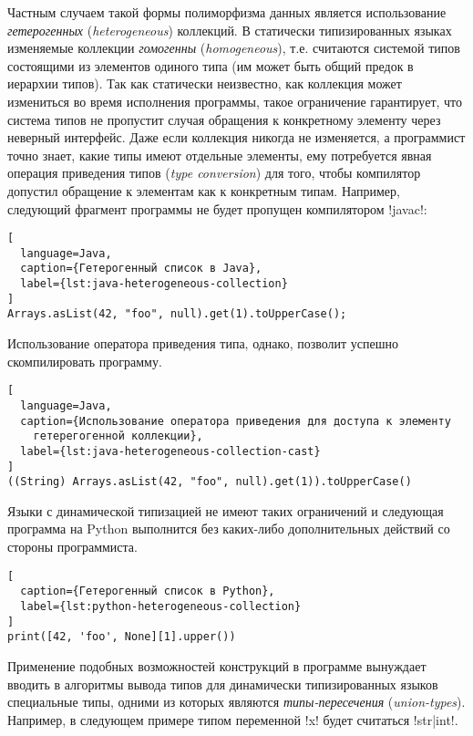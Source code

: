 Частным случаем такой формы полиморфизма данных является использование
\emph{гетерогенных} (\emph{heterogeneous}) коллекций. В статически
типизированных языках изменяемые коллекции \emph{гомогенны}
(\emph{homogeneous}), т.е. считаются системой типов состоящими из элементов
одиного типа (им может быть общий предок в иерархии типов).  Так как статически
неизвестно, как коллекция может измениться во время исполнения программы,
такое ограничение гарантирует, что система типов не пропустит случая обращения к
конкретному элементу через неверный интерфейс. Даже если коллекция никогда не
изменяется, а программист точно знает, какие типы имеют отдельные элементы, ему
потребуется явная операция приведения типов (\emph{type conversion}) для того, чтобы
компилятор допустил обращение к элементам как к конкретным типам. Например,
следующий фрагмент программы не будет пропущен компилятором !javac!:

\begin{lstlisting}[
  language=Java,
  caption={Гетерогенный список в Java},
  label={lst:java-heterogeneous-collection}
]
Arrays.asList(42, "foo", null).get(1).toUpperCase();
\end{lstlisting}

Использование оператора приведения типа, однако, позволит успешно скомпилировать
программу.

\begin{lstlisting}[
  language=Java,
  caption={Использование оператора приведения для доступа к элементу
    гетерегогенной коллекции},
  label={lst:java-heterogeneous-collection-cast}
]
((String) Arrays.asList(42, "foo", null).get(1)).toUpperCase()
\end{lstlisting}

Языки с динамической типизацией не имеют таких ограничений и следующая программа
на Python выполнится без каких-либо дополнительных действий со стороны
программиста.

\begin{lstlisting}[
  caption={Гетерогенный список в Python},
  label={lst:python-heterogeneous-collection}
]
print([42, 'foo', None][1].upper())
\end{lstlisting}

Применение подобных возможностей конструкций в программе вынуждает вводить в
алгоритмы вывода типов для динамически типизированных языков специальные типы,
одними из которых являются \emph{типы-пересечения} (\emph{union-types}).
Например, в следующем примере типом переменной !x! будет считаться !str|int!.


